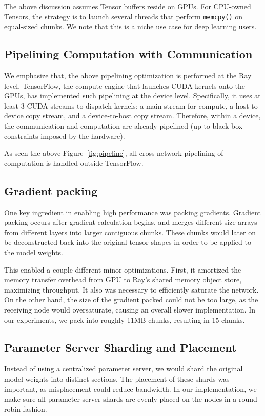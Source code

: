 The above discussion assumes Tensor buffers reside on GPUs.  For CPU-owned Tensors, the strategy is to launch several threads that perform \texttt{memcpy()} on equal-sized chunks.  We note that this is a niche use case for deep learning users.

\subsection{Pipelining Computation with Communication}

We emphasize that, the above pipelining optimization is performed at the Ray level.  TensorFlow, the compute engine that launches CUDA kernels onto the GPUs, has implemented such pipelining at the device level.  Specifically, it uses at least 3 CUDA streams to dispatch kernels: a main stream for compute, a host-to-device copy stream, and a device-to-host copy stream.  Therefore, within a device, the communication and computation are already pipelined (up to black-box constraints imposed by the hardware).


As seen the above Figure~\ref{fig:pipeline}, all cross network pipelining of computation is handled outside TensorFlow.

\subsection{Gradient packing}
One key ingredient in enabling high performance was packing gradients. Gradient packing occurs after gradient calculation begins, and merges different size arrays from different layers into larger contiguous chunks. These chunks would later on be deconstructed back into the original tensor shapes in order to be applied to the model weights.

This enabled a couple different minor optimizations. First, it amortized the memory transfer overhead from GPU to Ray's shared memory object store, maximizing throughput. It also was necessary to efficiently saturate the network. On the other hand, the size of the gradient packed could not be too large, as the receiving node would oversaturate, causing an overall slower implementation. In our experiments, we pack into roughly 11MB chunks, resulting in 15 chunks.

\subsection{Parameter Server Sharding and Placement}
Instead of using a centralized parameter server, we would shard the original model weights into distinct sections. The placement of these shards was important, as misplacement could reduce bandwidth. In our implementation, we make sure all parameter server shards are evenly placed on the nodes in a round-robin fashion.

